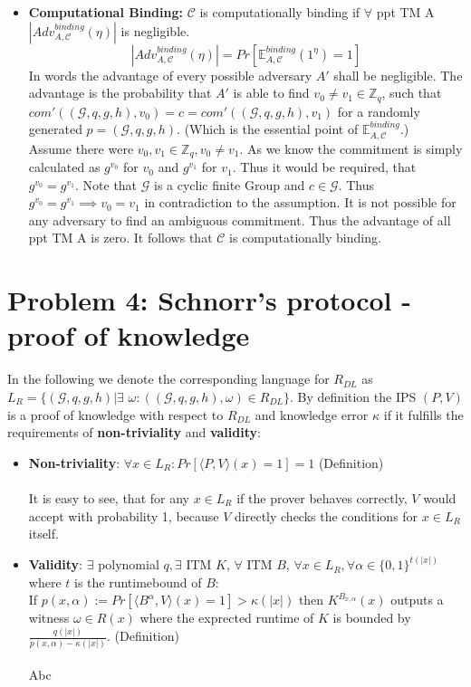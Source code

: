 \documentclass[12pt,pdftex,a4paper]{article}
\begin{document}
\begin{itemize}
\item \textbf{Computational Binding:}
$\mathcal{C}$ is computationally binding if $\forall$ ppt TM A $|Adv_{A,\mathcal{C}}^{binding}(\eta)|$ is negligible.
$$|Adv_{A,\mathcal{C}}^{binding}(\eta)| = Pr[\mathbb{E}_{A,\mathcal{C}}^{binding}(1^{\eta})=1]$$
In words the advantage of every possible adversary $A'$ shall be negligible. The advantage is the probability that $A'$ is able to find $v_0 \neq v_1 \in \mathbb{Z}_q$, such that $com'((\mathcal{G},q,g,h),v_0) = c = com'((\mathcal{G},q,g,h),v_1)$ for a randomly generated $p = (\mathcal{G},q,g,h)$. (Which is the essential point of $\mathbb{E}_{A,\mathcal{C}}^{binding}$.)\\
Assume there were $v_0, v_1 \in \mathbb{Z}_q, v_0 \neq v_1$. As we know the commitment is simply calculated as $g^{v_0}$ for $v_0$ and $g^{v_1}$ for $v_1$. Thus it would be required, that $g^{v_0} = g^{v_1}$. Note that $\mathcal{G}$ is a cyclic finite Group and $c \in \mathcal{G}$. Thus $g^{v_0} = g^{v_1} \implies v_0 = v_1$ in contradiction to the assumption. It is not possible for any adversary to find an ambiguous commitment. Thus the advantage of all ppt TM A is zero. It follows that $\mathcal{C}$ is computationally binding.
\end{itemize}

\section*{Problem 4: Schnorr’s protocol - proof of knowledge}
In the following we denote the corresponding language for $R_{DL}$ as $L_R = \{(\mathcal{G}, q, g, h)|\exists$ $\omega: ((\mathcal{G}, q, g, h), \omega)\in R_{DL}\}$.
By definition the IPS $(P,V)$ is a proof of knowledge with respect to $R_{DL}$ and knowledge error $\kappa$ if it fulfills the requirements of \textbf{non-triviality} and \textbf{validity}:
\begin{itemize}
\item \textbf{Non-triviality}: $\forall x \in L_R: Pr[\langle P, V \rangle (x) = 1] = 1$ (Definition)
\\~\\
It is easy to see, that for any $x \in L_R$ if the prover behaves correctly, $V$ would accept with probability 1, because $V$ directly checks the conditions for $x\in L_R$ itself.
\item \textbf{Validity}: $\exists$ polynomial $q, \exists$ ITM $K$, $\forall$ ITM $B$, $\forall x\in L_R,\forall\alpha\in\{0,1\}^{t(|x|)}$ where $t$ is the runtimebound of $B$:\\
If $p(x,\alpha) := Pr[\langle B^{\alpha}, V\rangle (x) = 1] > \kappa(|x|)$ then $K^{B_{x,\alpha}}(x)$ outputs a witness $\omega\in R(x)$ where the exprected runtime of $K$ is bounded by $\frac{q(|x|)}{p(x, \alpha)-\kappa(|x|)}$. (Definition)
\\~\\
Abc
\end{itemize}
\end{document}
